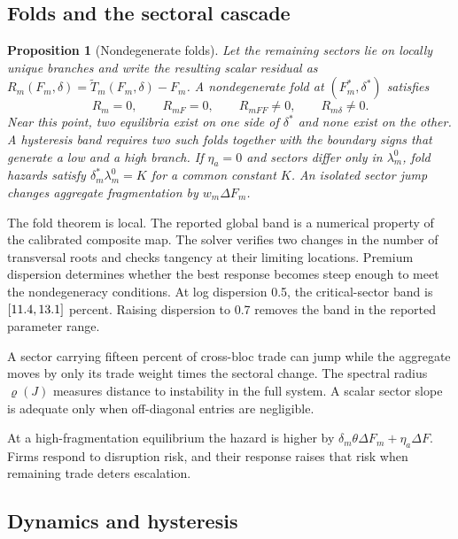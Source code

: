 \documentclass[11pt]{article}
\newtheorem{proposition}{Proposition}
\theoremstyle{definition}
\begin{document}
\subsection{Folds and the sectoral cascade}

\begin{proposition}[Nondegenerate folds]\label{prop:tipping}
Let the remaining sectors lie on locally unique branches and write the resulting scalar residual as $R_m(F_m,\delta)=\widetilde T_m(F_m,\delta)-F_m$. A nondegenerate fold at $(F_m^*,\delta^*)$ satisfies
\begin{equation}
R_m=0,\qquad R_{mF}=0,\qquad R_{mFF}\neq0,\qquad R_{m\delta}\neq0.
\label{eq:foldconditions}
\end{equation}
Near this point, two equilibria exist on one side of $\delta^*$ and none exist on the other. A hysteresis band requires two such folds together with the boundary signs that generate a low and a high branch. If $\eta_a=0$ and sectors differ only in $\lambda_m^0$, fold hazards satisfy $\delta_m^*\lambda_m^0=K$ for a common constant $K$. An isolated sector jump changes aggregate fragmentation by $w_m\Delta F_m$.
\end{proposition}

The fold theorem is local. The reported global band is a numerical property of the calibrated composite map. The solver verifies two changes in the number of transversal roots and checks tangency at their limiting locations. Premium dispersion determines whether the best response becomes steep enough to meet the nondegeneracy conditions. At log dispersion 0.5, the critical-sector band is $[11.4,13.1]$ percent. Raising dispersion to 0.7 removes the band in the reported parameter range.

A sector carrying fifteen percent of cross-bloc trade can jump while the aggregate moves by only its trade weight times the sectoral change. The spectral radius $\varrho(J)$ measures distance to instability in the full system. A scalar sector slope is adequate only when off-diagonal entries are negligible.

At a high-fragmentation equilibrium the hazard is higher by $\delta_m\theta\Delta F_m+\eta_a\Delta F$. Firms respond to disruption risk, and their response raises that risk when remaining trade deters escalation.

\subsection{Dynamics and hysteresis}
\end{document}

